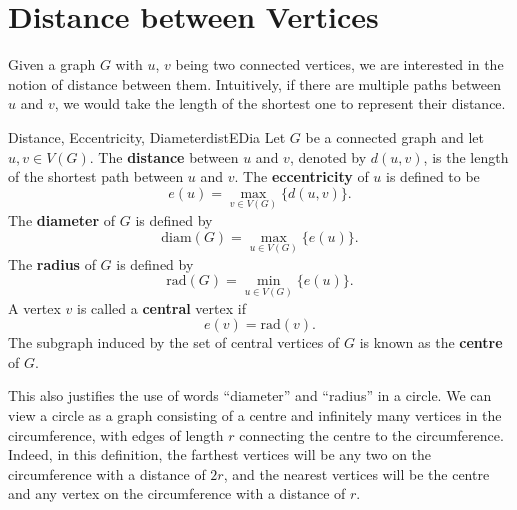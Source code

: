 \documentclass[math]{amznotes}
\theoremstyle{remark}
\begin{document}
\section{Distance between Vertices}
Given a graph $G$ with $u$, $v$ being two connected vertices, we are interested in the notion of distance between them. Intuitively, if there are multiple paths between $u$ and $v$, we would take the length of the shortest one to represent their distance.
\begin{dfnbox}{Distance, Eccentricity, Diameter}{distEDia}
    Let $G$ be a connected graph and let $u, v \in V(G)$. The {\color{red} \textbf{distance}} between $u$ and $v$, denoted by $d(u, v)$, is the length of the shortest path between $u$ and $v$. The {\color{red} \textbf{eccentricity}} of $u$ is defined to be
    \begin{equation*}
        e(u) = \max_{v \in V(G)}\{d(u, v)\}.
    \end{equation*}
    The {\color{red} \textbf{diameter}} of $G$ is defined by
    \begin{equation*}
        \mathrm{diam}(G) = \max_{u \in V(G)}\{e(u)\}.
    \end{equation*}
    The {\color{red} \textbf{radius}} of $G$ is defined by
    \begin{equation*}
        \mathrm{rad}(G) = \min_{u \in V(G)}\{e(u)\}.
    \end{equation*}
    A vertex $v$ is called a {\color{red} \textbf{central}} vertex if
    \begin{equation*}
        e(v) = \mathrm{rad}(v).
    \end{equation*}
    The subgraph induced by the set of central vertices of $G$ is known as the {\color{red} \textbf{centre}} of $G$.
\end{dfnbox}
This also justifies the use of words ``diameter'' and ``radius'' in a circle. We can view a circle as a graph consisting of a centre and infinitely many vertices in the circumference, with edges of length $r$ connecting the centre to the circumference. Indeed, in this definition, the farthest vertices will be any two on the circumference with a distance of $2r$, and the nearest vertices will be the centre and any vertex on the circumference with a distance of $r$.
\end{document}
